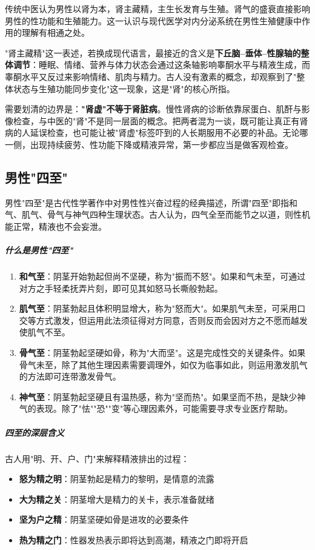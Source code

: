 传统中医认为男性以肾为本，肾主藏精，主生长发育与生殖。肾气的盛衰直接影响男性的性功能和生殖能力。这一认识与现代医学对内分泌系统在男性生殖健康中作用的理解有相通之处。


"肾主藏精"这一表述，若换成现代语言，最接近的含义是\textbf{下丘脑--垂体--性腺轴的整体调节}：睡眠、情绪、营养与体力状态会通过这条轴影响睾酮水平与精液生成，而睾酮水平又反过来影响情绪、肌肉与精力。古人没有激素的概念，却观察到了"整体状态与生殖功能同步变化"这一现象，这是"肾"的核心所指。

需要划清的边界是：\textbf{"肾虚"不等于肾脏病}。慢性肾病的诊断依靠尿蛋白、肌酐与影像检查，与中医的"肾"不是同一层面的概念。把两者混为一谈，既可能让真正有肾病的人延误检查，也可能让被"肾虚"标签吓到的人长期服用不必要的补品。无论哪一侧，出现持续疲劳、性功能下降或精液异常，第一步都应当是做客观检查。

\subsection{男性"四至"}

男性"四至"是古代性学著作中对男性性兴奋过程的经典描述，所谓"四至"即指和气、肌气、骨气与神气四种生理状态。古人认为，四气全至而能节之以道，则性机能正常，精液也不会妄泄。

\subparagraph{什么是男性"四至"}

\begin{enumerate}
    \item \textbf{和气至}：阴茎开始勃起但尚不坚硬，称为"振而不怒"。如果和气未至，可通过对方之手轻柔抚弄片刻，即可见其如怒马长嘶般勃起。

    \item \textbf{肌气至}：阴茎勃起且体积明显增大，称为"怒而大"。如果肌气未至，可采用口交等方式激发，但运用此法须征得对方同意，否则反而会因对方之不愿而越发使肌气不至。

    \item \textbf{骨气至}：阴茎勃起坚硬如骨，称为"大而坚"。这是完成性交的关键条件。如果骨气未至，除了其他生理因素需要调理外，如仅为临事如此，则运用激发肌气的方法即可连带激发骨气。

    \item \textbf{神气至}：阴茎勃起坚硬且有温热感，称为"坚而热"。如果坚而不热，是缺少神气的表现。除了"怯""恐""变"等心理因素外，可能需要寻求专业医疗帮助。
\end{enumerate}

\subparagraph{四至的深层含义}

古人用"明、开、户、门"来解释精液排出的过程：
\begin{itemize}
    \item \textbf{怒为精之明}：阴茎勃起是精力的黎明，是情意的流露
    \item \textbf{大为精之关}：阴茎增大是精力的关卡，表示准备就绪
    \item \textbf{坚为户之精}：阴茎坚硬如骨是进攻的必要条件
    \item \textbf{热为精之门}：性器发热表示即将达到高潮，精液之门即将开启
\end{itemize}

